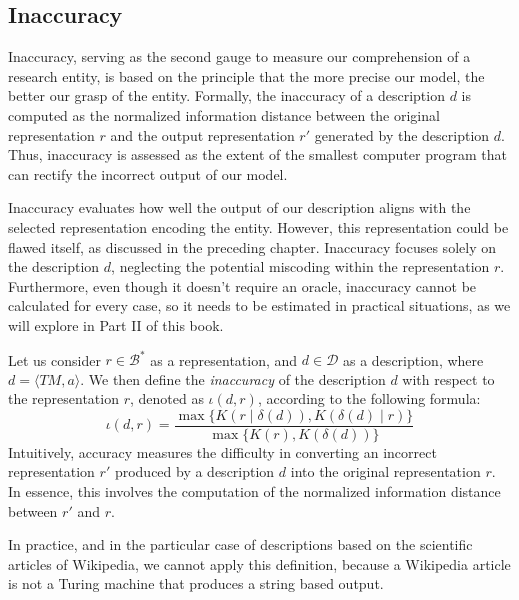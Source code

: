 \subsection{Inaccuracy}

Inaccuracy, serving as the second gauge to measure our comprehension of a research entity, is based on the principle that the more precise our model, the better our grasp of the entity. Formally, the inaccuracy of a description $d$ is computed as the normalized information distance between the original representation $r$ and the output representation $r'$ generated by the description $d$. Thus, inaccuracy is assessed as the extent of the smallest computer program that can rectify the incorrect output of our model.

Inaccuracy evaluates how well the output of our description aligns with the selected representation encoding the entity. However, this representation could be flawed itself, as discussed in the preceding chapter. Inaccuracy focuses solely on the description $d$, neglecting the potential miscoding within the representation $r$. Furthermore, even though it doesn't require an oracle, inaccuracy cannot be calculated for every case, so it needs to be estimated in practical situations, as we will explore in Part II of this book.

Let us consider $r \in \mathcal{B}^\ast$ as a representation, and $d \in \mathcal{D}$ as a description, where $d = \langle TM, a \rangle$. We then define the \emph{inaccuracy} of the description $d$ with respect to the representation $r$, denoted as $\iota(d, r)$, according to the following formula:
\[
\iota(d, r) = \frac{ \max\{ K \left(r \mid \delta(d) \right), K \left( \delta(d) \mid r \right) \} } { \max\{ K(r), K \left(\delta(d) \right) \} }
\]
Intuitively, accuracy measures the difficulty in converting an incorrect representation $r'$ produced by a description $d$ into the original representation $r$. In essence, this involves the computation of the normalized information distance between $r'$ and $r$.

In practice, and in the particular case of descriptions based on the scientific articles of Wikipedia, we cannot apply this definition, because a Wikipedia article is not a Turing machine that produces a string based output.

